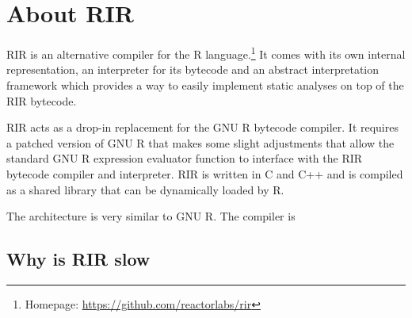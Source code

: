\chapter{About RIR\label{rir}}

RIR is an alternative compiler for the R language.\footnote{Homepage: \url{https://github.com/reactorlabs/rir}} It comes with its own internal representation, an interpreter for its bytecode and an abstract interpretation framework which provides a way to easily implement static analyses on top of the RIR bytecode.


RIR acts as a drop-in replacement for the GNU R bytecode compiler. It requires a patched version of GNU R that makes some slight adjustments that allow the standard GNU R expression evaluator function to interface with the RIR bytecode compiler and interpreter. RIR is written in C and C++ and is compiled as a shared library that can be dynamically loaded by R.

The architecture is very similar to GNU R. The compiler is 




\todo[guards]


\section{Why is RIR slow}

